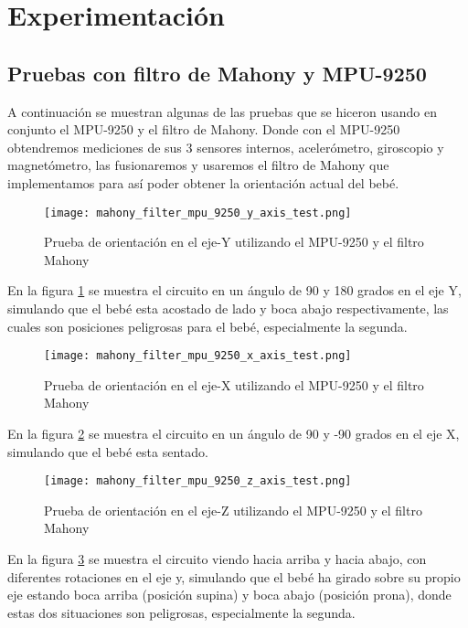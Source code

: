 



\section{Experimentación}
\subsection{Pruebas con filtro de Mahony y MPU-9250}
A continuación se muestran algunas de las pruebas que se hiceron usando en conjunto el
MPU-9250 y el filtro de Mahony. Donde con el MPU-9250 obtendremos mediciones de sus 3 sensores internos, acelerómetro,
giroscopio y magnetómetro, las fusionaremos y usaremos el filtro de Mahony que
implementamos para así poder obtener la orientación actual del bebé.

\begin{figure}[htp!]
    \centering
    \texttt{[image: mahony\_filter\_mpu\_9250\_y\_axis\_test.png]}
    \caption{Prueba de orientación en el eje-Y utilizando el MPU-9250 y el filtro Mahony}
    \label{fig: test-y}
\end{figure}
\FloatBarrier

En la figura \ref{fig: test-y} se muestra el circuito en un ángulo de 90 y 180 grados en el eje Y, simulando que el bebé
esta acostado de lado y boca abajo respectivamente, las cuales son posiciones peligrosas para el bebé, especialmente
la segunda.

\begin{figure}[htp!]
    \centering
    \texttt{[image: mahony\_filter\_mpu\_9250\_x\_axis\_test.png]}
    \caption{Prueba de orientación en el eje-X utilizando el MPU-9250 y el filtro Mahony}
    \label{fig: test-x}
\end{figure}
\FloatBarrier

En la figura \ref{fig: test-x} se muestra el circuito en un ángulo de 90 y -90 grados en el eje X, simulando que el bebé
esta sentado.

\begin{figure}[htp!]
    \centering
    \texttt{[image: mahony\_filter\_mpu\_9250\_z\_axis\_test.png]}
    \caption{Prueba de orientación en el eje-Z utilizando el MPU-9250 y el filtro Mahony}
    \label{fig: test-z}
\end{figure}
\FloatBarrier

En la figura \ref{fig: test-z} se muestra el circuito viendo hacia arriba y hacia abajo, con diferentes rotaciones en el eje y,
simulando que el bebé ha girado sobre su propio eje estando boca arriba (posición supina) y boca abajo (posición prona), donde estas
dos situaciones son peligrosas, especialmente la segunda.\newline

